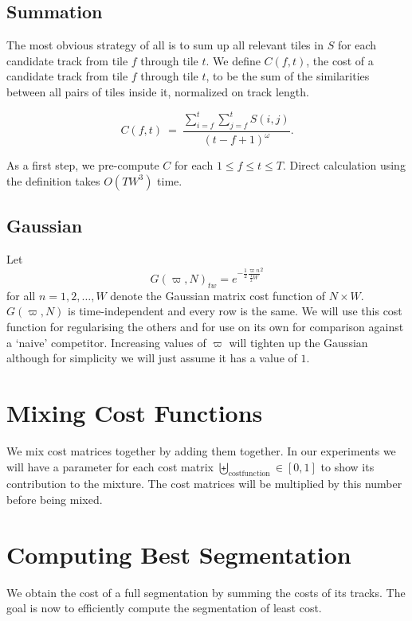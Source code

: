 \documentclass[twocolumn]{article}
\begin{document}
\subsection{Summation}

The most obvious strategy of all is to sum up all relevant tiles in $S$ for each candidate track from tile $f$ through tile $t$. We define $C(f,t)$, the cost of a candidate track from tile $f$ through tile $t$, to be the sum of the similarities between all pairs of tiles inside it, normalized on track length.

\begin{dmath*}
C(f,t) ~=~ \frac{ \sum_{i=f}^{t} \sum_{j=f}^{t} S(i,j) }{ (t-f+1)^\omega }.
\end{dmath*}

As a first step, we pre-compute $C$ for each $1 \le f \le t \le T$. Direct calculation using the definition takes $O(T W^3)$ time.


\subsection{Gaussian}
Let \[
G( \varpi, N )_{tw} = e^{ - \frac{1}{2} \frac{\varpi n}{ \frac{1}{2} W}^2  }
\] for all $n=1,2,\ldots,W$ denote the Gaussian matrix cost function of $N\times W$. $G( \varpi, N )$ is time-independent and every row is the same. We will use this cost function for regularising the others and for use on its own for comparison against a `naive' competitor. Increasing values of $\varpi$ will tighten up the Gaussian although for simplicity we will just assume it has a value of $1$.

\section{Mixing Cost Functions}

We mix cost matrices together by adding them together. In our experiments we will have a parameter for each cost matrix $\biguplus_{\mathrm{costfunction}} \in [0,1]$ to show its contribution to the mixture. The cost matrices will be multiplied by this number before being mixed. 

\section{Computing Best Segmentation}\label{best_cost}

We obtain the cost of a full segmentation by summing the costs of its tracks. The goal is now to efficiently compute the segmentation of least cost.
\end{document}
